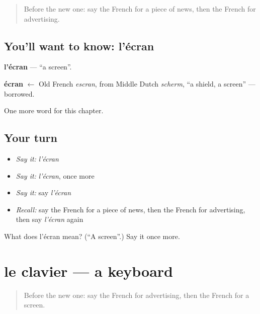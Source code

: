 \label{lesson:FR-C195-ecran}



\begin{quote}
Before the new one: say the French for a piece of news, then the French for advertising.
\end{quote}

\subsection*{You'll want to know: l'écran}
\textbf{l'écran} — \textquotedblleft{}a screen\textquotedblright{}.

\begin{cousinweb}
\textbf{écran} $\leftarrow$ Old French \emph{escran}, from Middle Dutch \emph{scherm}, \textquotedblleft{}a shield, a screen\textquotedblright{} — borrowed.
\end{cousinweb}

\begin{grammarlens}[title={What you've built}]
One more word for this chapter.
\end{grammarlens}

\subsection*{Your turn}
\begin{itemize}
\raggedright
  \item \emph{Say it:} \emph{l'écran}
  \item \emph{Say it:} \emph{l'écran}, once more
  \item \emph{Say it:} say \emph{l'écran}
  \item \emph{Recall:} say the French for a piece of news, then the French for advertising, then say \emph{l'écran} again
\end{itemize}

\begin{tcolorbox}[breakable,colback=teal!4,colframe=teal!35!black,title={Before you move on}]
What does l'écran mean? (\textquotedblleft{}A screen\textquotedblright{}.) Say it once more.
\end{tcolorbox}
\section[le clavier]{le clavier — a keyboard}

\label{lesson:FR-C195-clavier}



\begin{quote}
Before the new one: say the French for advertising, then the French for a screen.
\end{quote}

